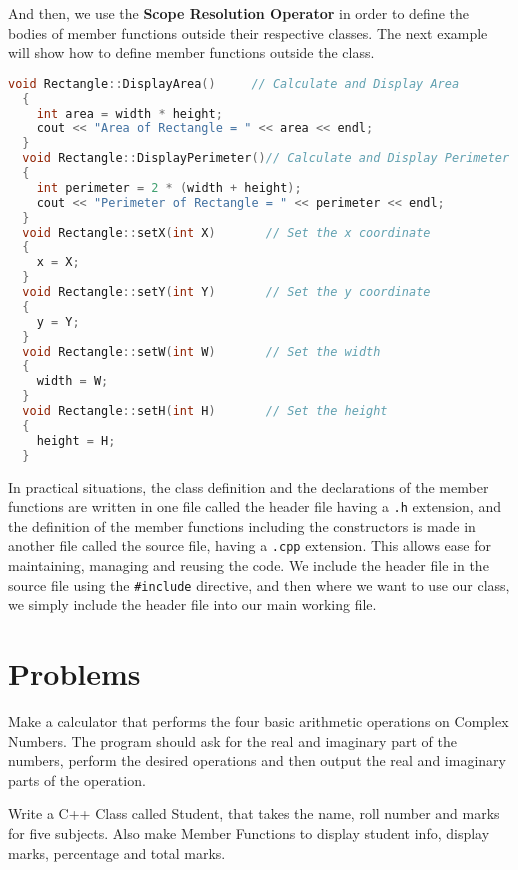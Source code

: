 \documentclass[11pt,fleqn]{book} %
\begin{document}
And then, we use the \textbf{Scope Resolution Operator} in order to define the bodies of member functions outside their respective classes. The next example will show how to define member functions outside the class.

\begin{lstlisting}[language=C++, caption=Class Definition using the \texttt{struct} keyword in C++]
  void Rectangle::DisplayArea()     // Calculate and Display Area
  {
    int area = width * height;
    cout << "Area of Rectangle = " << area << endl;
  }
  void Rectangle::DisplayPerimeter()// Calculate and Display Perimeter
  {
    int perimeter = 2 * (width + height);
    cout << "Perimeter of Rectangle = " << perimeter << endl;
  }
  void Rectangle::setX(int X)       // Set the x coordinate
  {
    x = X;
  }
  void Rectangle::setY(int Y)       // Set the y coordinate
  {
    y = Y;
  }
  void Rectangle::setW(int W)       // Set the width
  {
    width = W;
  }
  void Rectangle::setH(int H)       // Set the height
  {
    height = H;
  }
\end{lstlisting}

In practical situations, the class definition and the declarations of the member functions are written in one file called the header file having a \texttt{.h} extension, and the definition of the member functions including the constructors is made in another file called the source file, having a \texttt{.cpp} extension. This allows ease for maintaining, managing and reusing the code. We include the header file in the source file using the \texttt{\#include} directive, and then where we want to use our class, we simply include the header file into our main working file.

\newpage
\section{Problems}

\begin{problem} Make a calculator that performs the four basic arithmetic operations on Complex Numbers. The program should ask for the real and imaginary part of the numbers, perform the desired operations and then output the real and imaginary parts of the operation.\\
\end{problem} 

\begin{problem} Write a C++ Class called Student, that takes the name, roll number and marks for five subjects. Also make Member Functions to display student info, display marks, percentage and total marks.\\
\end{problem}
\end{document}
